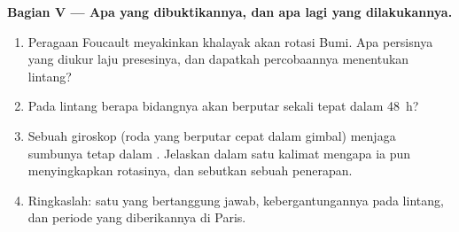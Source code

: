 \begin{problem}
\medskip
\noindent\textbf{Bagian V --- Apa yang dibuktikannya, dan apa lagi yang dilakukannya.}
\begin{enumerate}[resume]
  \item Peragaan Foucault meyakinkan khalayak akan rotasi Bumi.
        Apa persisnya yang diukur laju presesinya, dan
        dapatkah percobaannya menentukan lintang?
  \item Pada lintang berapa bidangnya akan berputar sekali tepat dalam \qty{48}{h}?
  \item Sebuah giroskop (roda yang berputar cepat dalam gimbal) menjaga sumbunya
        tetap dalam . Jelaskan dalam satu kalimat mengapa ia pun
        menyingkapkan rotasinya, dan sebutkan sebuah penerapan.
  \item Ringkaslah: satu  yang bertanggung jawab, kebergantungannya
        pada lintang, dan periode yang diberikannya di Paris.
\end{enumerate}
\end{problem}
